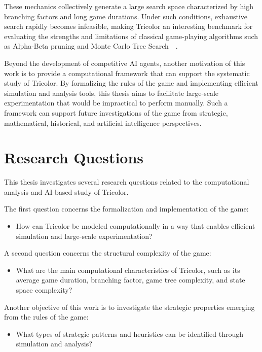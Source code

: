 These mechanics collectively generate a large search space characterized by high branching factors and long game durations. Under such conditions, exhaustive search rapidly becomes infeasible, making Tricolor an interesting benchmark for evaluating the strengths and limitations of classical game-playing algorithms such as Alpha-Beta pruning and Monte Carlo Tree Search~\cite{russell2010aima}~\cite{browne2012mcts}.

Beyond the development of competitive AI agents, another motivation of this work is to provide a computational framework that can support the systematic study of Tricolor. By formalizing the rules of the game and implementing efficient simulation and analysis tools, this thesis aims to facilitate large-scale experimentation that would be impractical to perform manually. Such a framework can support future investigations of the game from strategic, mathematical, historical, and artificial intelligence perspectives.

\section{Research Questions}

This thesis investigates several research questions related to the computational analysis and AI-based study of Tricolor.

The first question concerns the formalization and implementation of the game:

\begin{itemize}
    \item How can Tricolor be modeled computationally in a way that enables efficient simulation and large-scale experimentation?
\end{itemize}

A second question concerns the structural complexity of the game:

\begin{itemize}
    \item What are the main computational characteristics of Tricolor, such as its average game duration, branching factor, game tree complexity, and state space complexity?
\end{itemize}

Another objective of this work is to investigate the strategic properties emerging from the rules of the game:

\begin{itemize}
    \item What types of strategic patterns and heuristics can be identified through simulation and analysis?
\end{itemize}

